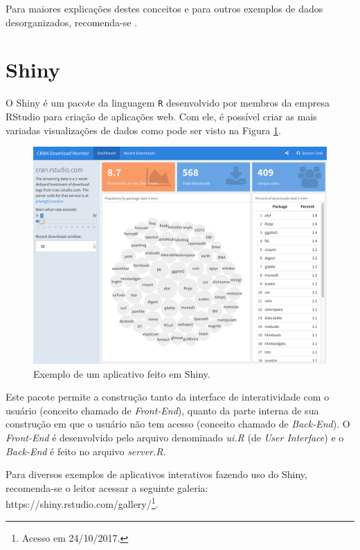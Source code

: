 \documentclass[12pt,openright,oneside,a4paper,english,french,spanish]{abntex2}
\numberwithin{table}{section} %
\numberwithin{figure}{section} %
\newcommand{\co}{\citeonline}
\begin{document}
Para maiores explicações destes conceitos e para outros exemplos de dados desorganizados, recomenda-se \co{tidy_data}.


\section{Shiny\label{sec:shiny}}

O Shiny \cite{shiny} é um pacote da linguagem \texttt{R} desenvolvido por membros da empresa RStudio para criação de aplicações web. Com ele, é possível criar as mais variadas visualizações de dados como pode ser visto na Figura \ref{fig:shiny_example}.


\begin{figure}[H]
\centering
\includegraphics[width=.75\linewidth]{dashboard_shiny_example.png}
\caption{Exemplo de um aplicativo feito em Shiny.}
\label{fig:shiny_example}
\end{figure}

Este pacote permite a construção tanto da interface de interatividade com o usuário (conceito chamado de \textit{Front-End}), quanto da parte interna de sua construção em que o usuário não tem acesso (conceito chamado de \textit{Back-End}). O \textit{Front-End} é desenvolvido  pelo arquivo denominado \textit{ui.R} (de \textit{User Interface}) e o \textit{Back-End} é feito no arquivo \textit{server.R}.

Para diversos exemplos de aplicativos interativos fazendo uso do Shiny, recomenda-se o leitor acessar a seguinte galeria: https://shiny.rstudio.com/gallery/\footnote{Acesso em 24/10/2017.}.
\end{document}
